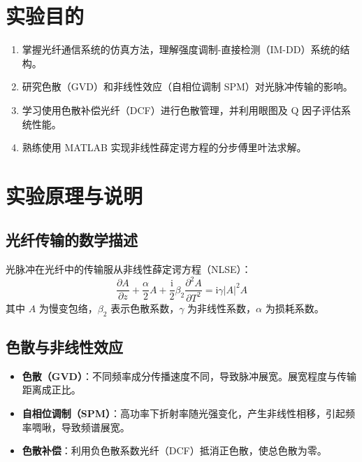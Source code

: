 \documentclass{../ElectromagneticFieldTemplate}
\begin{document}
\maketitle


\section{实验目的}

\begin{enumerate}
    \item 掌握光纤通信系统的仿真方法，理解强度调制-直接检测（IM-DD）系统的结构。
    \item 研究色散（GVD）和非线性效应（自相位调制 SPM）对光脉冲传输的影响。
    \item 学习使用色散补偿光纤（DCF）进行色散管理，并利用眼图及 Q 因子评估系统性能。
    \item 熟练使用 MATLAB 实现非线性薛定谔方程的分步傅里叶法求解。
\end{enumerate}

\section{实验原理与说明}

\subsection{光纤传输的数学描述}
光脉冲在光纤中的传输服从非线性薛定谔方程（NLSE）：
\[
\frac{\partial A}{\partial z} + \frac{\alpha}{2} A + \frac{\mathrm{i}}{2}\beta_2 \frac{\partial^2 A}{\partial T^2} = \mathrm{i}\gamma |A|^2 A
\]
其中 \(A\) 为慢变包络，\(\beta_2\) 表示色散系数，\(\gamma\) 为非线性系数，\(\alpha\) 为损耗系数。

\subsection{色散与非线性效应}
\begin{itemize}
    \item \textbf{色散（GVD）}：不同频率成分传播速度不同，导致脉冲展宽。展宽程度与传输距离成正比。
    \item \textbf{自相位调制（SPM）}：高功率下折射率随光强变化，产生非线性相移，引起频率啁啾，导致频谱展宽。
    \item \textbf{色散补偿}：利用负色散系数光纤（DCF）抵消正色散，使总色散为零。
\end{itemize}
\end{document}
